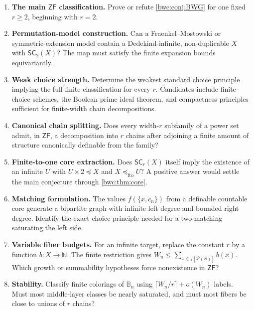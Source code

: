 \documentclass[11pt,letterpaper]{article}
\numberwithin{equation}{section}
\theoremstyle{plain}
\theoremstyle{definition}
\theoremstyle{remark}
\newcommand{\Pow}{\mathcal P}
\newcommand{\B}{\mathbb B}
\newcommand{\NN}{\mathbb N}
\newcommand{\SC}{\mathsf{SC}}
\newcommand{\ZF}{\mathsf{ZF}}
\newcommand{\fto}{\preccurlyeq_{\mathrm{fto}}}
\begin{document}
\begin{enumerate}
\item \label{bwc:q:main}\textbf{The main $\ZF$ classification.}  Prove or refute
      \cref{bwc:conj:BWG} for one fixed $r\geq2$, beginning with $r=2$.

\item \label{bwc:q:permutation}\textbf{Permutation-model construction.}  Can a Fraenkel--Mostowski or
      symmetric-extension model contain a Dedekind-infinite, non-duplicable
      $X$ with $\SC_2(X)$?  The map must satisfy the finite expansion bounds
      equivariantly.

\item \label{bwc:q:weakchoice}\textbf{Weak choice strength.}  Determine the weakest standard choice
      principle implying the full finite classification for every $r$.
      Candidates include finite-choice schemes, the Boolean prime ideal
      theorem, and compactness principles sufficient for finite-width chain
      decompositions.

\item \label{bwc:q:canonical}\textbf{Canonical chain splitting.}  Does every width-$r$ subfamily of
      a power set admit, in $\ZF$, a decomposition into $r$ chains after
      adjoining a finite amount of structure canonically definable from the
      family?

\item \label{bwc:q:core}\textbf{Finite-to-one core extraction.}  Does $\SC_r(X)$ itself imply
      the existence of an infinite $U$ with $U\times2\preccurlyeq X$ and
      $X\fto U$?  A positive answer would settle the main conjecture through
      \cref{bwc:thm:core}.

\item \label{bwc:q:matching}\textbf{Matching formulation.}  The values
      $f(\{x,c_n\})$ from a definable countable core generate a bipartite graph
      with infinite left degree and bounded right degree.  Identify the exact
      choice principle needed for a two-matching saturating the left side.

\item \label{bwc:q:budgets}\textbf{Variable fiber budgets.}  For an infinite target, replace the
      constant $r$ by a function $b:X\to\NN$.  The finite restriction gives
      $W_n\leq\sum_{x\in f[\Pow(S)]}b(x)$.  Which growth or summability
      hypotheses force nonexistence in $\ZF$?

\item \label{bwc:q:stability}\textbf{Stability.}  Classify finite colorings of $\B_n$ using
      $\lceil W_n/r\rceil+o(W_n)$ labels.  Must most middle-layer classes be
      nearly saturated, and must most fibers be close to unions of $r$
      chains?


\end{enumerate}
\end{document}
